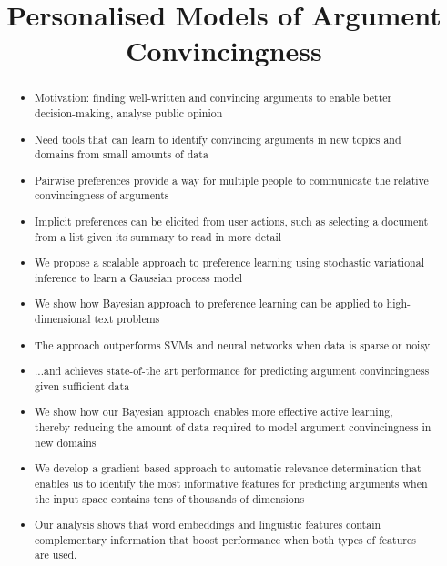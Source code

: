 \documentclass[11pt]{article}
\title{ 
Personalised Models of Argument Convincingness
}
\author{\IEEEauthorblockN{Anonymous}
\IEEEauthorblockA{Anonymous, \\
Anonymous \\
Email: anonymous}
\and
\IEEEauthorblockN{Anonymous}
\IEEEauthorblockA{Anonymous, \\
Anonymous \\
Email: anonymous}
\and
\IEEEauthorblockN{Anonymous}
\IEEEauthorblockA{Anonymous, \\
Anonymous \\
Email: anonymous}
}
\begin{document}
\maketitle

\begin{abstract}

\begin{itemize}
  \item Motivation: finding well-written and convincing arguments to enable better decision-making, analyse public opinion
  \item Need tools that can learn to identify convincing arguments in new topics and domains from small amounts of data
  \item Pairwise preferences provide a way for multiple people to communicate the relative convincingness of arguments 
  \item Implicit preferences can be elicited from user actions, such as selecting a document from a list given its summary to read in more detail
  \item We propose a scalable approach to preference learning using stochastic variational inference to learn a Gaussian process model
  \item We show how Bayesian approach to preference learning can be applied to high-dimensional text problems
  \item The approach outperforms SVMs and neural networks when data is sparse or noisy  
  \item ...and achieves state-of-the art performance for predicting argument convincingness given sufficient data
  \item We show how our Bayesian approach enables more effective active learning, thereby reducing the amount of data required to model argument convincingness in new domains
  \item We develop a gradient-based approach to automatic relevance determination that enables us to identify the most informative features for predicting arguments when the input space contains tens of thousands of dimensions
  \item Our analysis shows that word embeddings and linguistic features contain complementary information that boost performance when both types of features are used.
\end{itemize}




\end{abstract}

%
\end{document}
